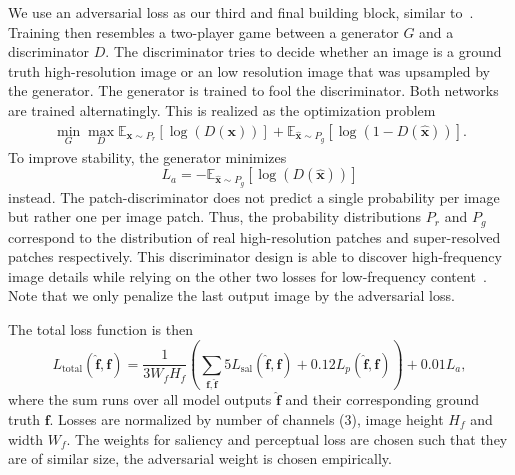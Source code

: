\documentclass{scrartcl}
\newcommand{\img}{\bm{f}} %
\begin{document}
We use an adversarial loss as our third and final building block, similar to~\cite{SRGAN}.
Training then resembles a two-player game between a generator \(G\) and a discriminator \(D\).
The discriminator tries to decide whether an image is a ground truth high-resolution image or an low resolution image that was upsampled by the generator.
The generator is trained to fool the discriminator.
Both networks are trained alternatingly.
This is realized as the optimization problem~\cite{GAN}
\begin{align}
 \min_G \max_D \mathbb{E}_{\bm{x} \sim P_r} \left[ \log (D({\bm{x}})) \right] +
  \mathbb{E}_{\hat{\bm{x}} \sim P_g} \left[  \log (1 - D(\hat{\bm{x}})) \right].
\end{align}
To improve stability, the generator minimizes
\begin{equation}
  L_a = - \mathbb{E}_{\hat{\bm{x}} \sim P_g} \left[ \log (D(\hat{\bm{x}})) \right]
\end{equation}
instead.
The patch-discriminator does not predict a single probability per image but rather one per image patch.
Thus, the probability distributions $P_r$ and $P_g$ correspond to the distribution of real high-resolution patches and super-resolved patches respectively.
This discriminator design is able to discover high-frequency image details while relying on the other two losses for low-frequency content~\cite{PatchGAN}.
Note that we only penalize the last output image by the adversarial loss.

The total loss function is then
\begin{equation}
  \label{eq:total-loss}
L_\text{total}(\hat{\img}, \img) = \frac{1}{3 W_{f} H_{f}}
\left( \sum_{\img, \hat{\img}}
  5 L_{\text{sal}} (\hat{\img}, \img) + 0.12  L_p(\hat{\img}, \img) \right) + 0.01 L_a,
\end{equation}
where the sum runs over all model outputs \(\hat{\img}\) and their corresponding ground truth \(\img\).
Losses are normalized by number of channels (3), image height \(H_{f}\) and width \(W_{f}\).
The weights for saliency and perceptual loss are chosen such that they are of similar size, the adversarial weight is chosen empirically.
\end{document}
